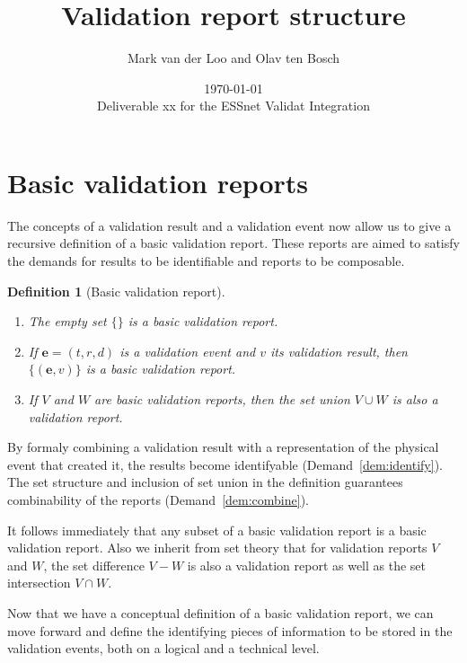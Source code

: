 \documentclass[a4paper, 11pt,titlepage]{article}
\title{Validation report structure}
\author{Mark van der Loo and Olav ten Bosch}
\date{\today\\
\vspace{1cm}
Deliverable xx for the ESSnet Validat Integration
}
\newtheorem{definition}{Definition}
\newcommand{\la}[1]{\boldsymbol{#1}}
\begin{document}
\maketitle{}

\tableofcontents{}

\newpage






 
\section{Basic validation reports}
The concepts of a validation result and a validation event now allow us to give
a recursive definition of a basic validation report. These reports are aimed to
satisfy the demands for results to be identifiable and reports to be
composable.
%
\begin{definition}[Basic validation report]\leavevmode
\begin{enumerate}[topsep=0pt,itemsep=0pt]
\item The empty set $\{\}$ is a basic validation report.
\item If $\la{e}=(t,r,d)$ is a validation event and $v$ its validation result,
then $\{(\la{e},v)\}$ is a basic validation report.
\item If $V$ and $W$ are basic validation reports, then the set union $V\cup W$
is also a validation report.
\end{enumerate}
\end{definition}
%
By formaly combining a validation result with a representation of the physical
event that created it, the results become identifyable
(Demand~\ref{dem:identify}).  The set structure and inclusion of set union in
the definition guarantees combinability of the reports
(Demand~\ref{dem:combine}).

It follows immediately that any subset of a basic validation report is a basic
validation report. Also we inherit from set theory that for validation reports
$V$ and $W$, the set difference $V-W$ is also a validation report as well as
the set intersection $V\cap W$.

Now that we have a conceptual definition of a basic validation report, we can
move forward and define the identifying pieces of information to be stored in
the validation events, both on a logical and a technical level.


\end{document}
